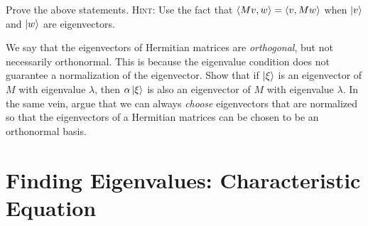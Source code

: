 \documentclass[12pt, oneside]{report}    %
\let\oldsection\section
\def\section{%
  \setcounter{sidenote}{1}%
  \oldsection
}
\begin{document}
\begin{exercise}
Prove the above statements. \textsc{Hint:} Use the fact that $\langle Mv, w \rangle = \langle v, M w \rangle$ when $\left|v\right\rangle$ and $\left|w\right\rangle$ are eigenvectors. 
\end{exercise}

\begin{exercise}\label{ex:orthogonal:eigenvectors:not:normal}
We say that the eigenvectors of Hermitian matrices are \emph{orthogonal}, but not necessarily orthonormal. This is because the eigenvalue condition does not guarantee a normalization of the eigenvector. Show that if $\left|\xi\right\rangle$ is an eigenvector of $M$ with eigenvalue $\lambda$, then $\alpha\left|\xi\right\rangle$ is also an eigenvector of $M$ with eigenvalue $\lambda$. In the same vein, argue that we can always \emph{choose} eigenvectors that are normalized so that the eigenvectors of a Hermitian matrices can be chosen to be an orthonormal basis.
\end{exercise}

\section{Finding Eigenvalues: Characteristic Equation}
\end{document}
